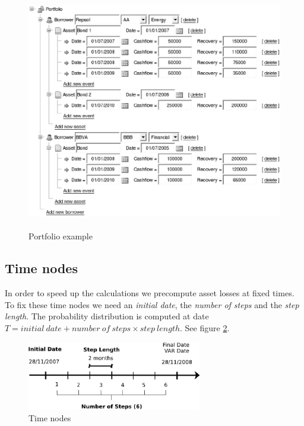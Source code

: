 \documentclass[a4paper,12pt,final]{article}
\begin{document}
\begin{figure}[!hbt]
\begin{center}
\includegraphics[height=10.5cm, angle=0]{./images/portfolio.eps}
\caption{Portfolio example}
\label{portfolio}
\end{center}
\end{figure}
\FloatBarrier

\subsection{Time nodes}
In order to speed up the calculations we precompute asset losses at fixed 
times. To fix these time nodes we need an \emph{initial date}, the 
\emph{number of steps} and the \emph{step length}. The probability distribution
is computed at date $T = initial\ date + number\ of\ steps \times step\ length$.
See figure \ref{cctime1}.

\begin{figure}[!hbt]
\begin{center}
\includegraphics[height=3.0cm, angle=0]{./images/cctime1.eps}
\caption{Time nodes}
\label{cctime1}
\end{center}
\end{figure}
\FloatBarrier
\end{document}
